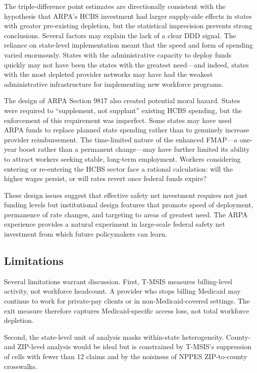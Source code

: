 \documentclass[12pt]{article}
\begin{document}
The triple-difference point estimates are directionally consistent with the hypothesis that ARPA's HCBS investment had larger supply-side effects in states with greater pre-existing depletion, but the statistical imprecision prevents strong conclusions. Several factors may explain the lack of a clear DDD signal. The reliance on state-level implementation meant that the speed and form of spending varied enormously. States with the administrative capacity to deploy funds quickly may not have been the states with the greatest need---and indeed, states with the most depleted provider networks may have had the weakest administrative infrastructure for implementing new workforce programs.

The design of ARPA Section 9817 also created potential moral hazard. States were required to ``supplement, not supplant'' existing HCBS spending, but the enforcement of this requirement was imperfect. Some states may have used ARPA funds to replace planned state spending rather than to genuinely increase provider reimbursement. The time-limited nature of the enhanced FMAP---a one-year boost rather than a permanent change---may have further limited its ability to attract workers seeking stable, long-term employment. Workers considering entering or re-entering the HCBS sector face a rational calculation: will the higher wages persist, or will rates revert once federal funds expire?

These design issues suggest that effective safety net investment requires not just funding levels but institutional design features that promote speed of deployment, permanence of rate changes, and targeting to areas of greatest need. The ARPA experience provides a natural experiment in large-scale federal safety net investment from which future policymakers can learn.

\subsection{Limitations}

Several limitations warrant discussion. First, T-MSIS measures billing-level activity, not workforce headcount. A provider who stops billing Medicaid may continue to work for private-pay clients or in non-Medicaid-covered settings. The exit measure therefore captures Medicaid-specific access loss, not total workforce depletion.

Second, the state-level unit of analysis masks within-state heterogeneity. County- and ZIP-level analysis would be ideal but is constrained by T-MSIS's suppression of cells with fewer than 12 claims and by the noisiness of NPPES ZIP-to-county crosswalks.
\end{document}
